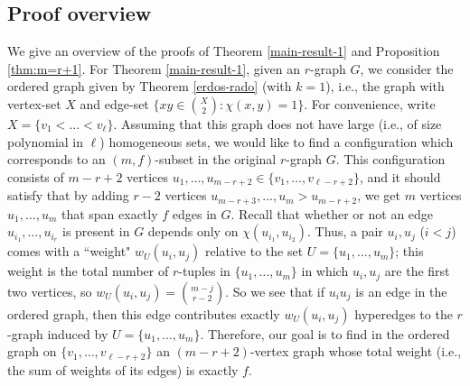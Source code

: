 \documentclass[11pt]{article}
\theoremstyle{plain}
\begin{document}
\subsection{Proof overview}\label{subsec:overview}

We give an overview of the proofs of Theorem \ref{main-result-1} and Proposition \ref{thm:m=r+1}.  
For Theorem \ref{main-result-1}, given an $r$-graph $G$, we consider the ordered graph given by Theorem \ref{erdos-rado} (with $k=1$), i.e., the graph with vertex-set $X$ and edge-set 
$\{xy \in \binom{X}{2} : \chi(x,y) = 1\}$. For convenience, write $X = \{v_1 < \dots < v_{\ell}\}$.
Assuming that this graph does not have large (i.e., of size polynomial in $\ell$) homogeneous sets, we would like to find a configuration which corresponds to an $(m,f)$-subset in the original $r$-graph $G$. This configuration consists of $m-r+2$ vertices $u_1,\dots,u_{m-r+2} \in \{v_1,\dots,v_{\ell-r+2}\}$, and it should satisfy that by adding $r-2$ vertices $u_{m-r+3},\dots,u_m > u_{m-r+2}$, we get $m$ vertices $u_1,\dots,u_m$ that span exactly $f$ edges in $G$. Recall that whether or not an edge $u_{i_1},\dots,u_{i_r}$ is present in $G$ depends only on $\chi(u_{i_1},u_{i_2})$. Thus, a pair $u_i,u_j$ ($i < j$) comes with a ``weight" $w_U(u_i,u_j)$ relative to the set $U = \{u_1,\dots,u_m\}$; this weight is the total number of $r$-tuples in $\{u_1,\dots,u_m\}$ in which $u_i,u_j$ are the first two vertices, so $w_U(u_i,u_j) = \binom{m-j}{r-2}$. So we see that if $u_iu_j$ is an edge in the ordered graph, then this edge contributes exactly $w_U(u_i,u_j)$ hyperedges to the $r$-graph induced by $U = \{u_1,\dots,u_m\}$. Therefore, our goal is to find in the ordered graph on 
$\{v_1,\dots,v_{\ell-r+2}\}$ an $(m-r+2)$-vertex graph whose total weight (i.e., the sum of weights of its edges) is exactly $f$. 
\end{document}
